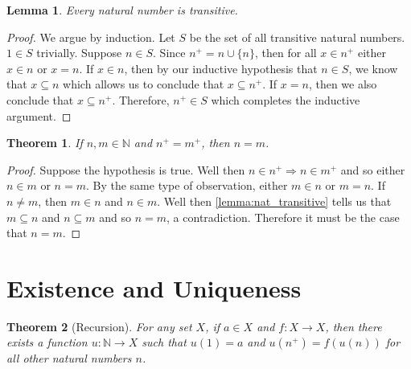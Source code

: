 \documentclass{article}
\theoremstyle{definition}
\theoremstyle{definition}
\theoremstyle{plain}
\theoremstyle{remark}
\theoremstyle{plain}
\newtheorem{theorem}{Theorem}[section]
\theoremstyle{remark}
\theoremstyle{plain}
\newtheorem{lemma}{Lemma}[section]
\theoremstyle{plain}
\theoremstyle{plain}
\theoremstyle{plain}
\begin{document}
\begin{lemma}
  Every natural number is transitive.
  \label{lemma:nat_transitive}
\end{lemma}

\begin{proof}
  We argue by induction. 
  Let \( S \) be the set of all transitive natural numbers. \( 1 \in S \) 
  trivially. Suppose \( n \in S \). Since \( n^{+} = n \cup \{n\} \), then 
  for all \( x \in n^{+} \) either \( x \in n \) or \( x = n \). If 
  \( x \in n \), then 
  by our inductive hypothesis that \( n \in S \), we know that 
  \( x \subseteq n\) which allows us to conclude that \( x \subseteq n^{+} \). 
  If \( x = n \), then we also conclude that \( x \subseteq n^{+} \). 
  Therefore, \( n^{+} \in S \) which completes the inductive argument.
\end{proof}

\begin{theorem}
  If \( n, m \in \mathbb{N}\) and \( n^{+} = m^{+} \), then \( n = m \).
  \label{thm:fifth_peano_axiom}
\end{theorem}

\begin{proof}
  Suppose the hypothesis is true. Well then 
  \( n \in n^{+} \Rightarrow n \in m^{+} \) and so either \( n \in m \) or 
  \( n = m \). By the same type of observation, either \( m \in n \) or \( m = n \). 
  If \( n \neq m\), then \( m \in n \) and \( n \in m \). 
  Well then \autoref{lemma:nat_transitive} tells us that 
  \( m \subseteq n \) and \( n \subseteq m \) and so \( n = m \), a 
  contradiction. Therefore it must be the case that \( n = m \).
\end{proof}

\section{Existence and Uniqueness}

\begin{theorem}[Recursion]
  For any set \( X \), if \( a \in X \) and \( f : X \rightarrow X \), then 
  there exists a function \( u: \mathbb{N} \rightarrow X \) such that 
  \( u(1) = a \) and \( u(n^{+}) = f(u(n)) \) for all other natural numbers 
  \( n \). 
  \label{recursion}
\end{theorem}
\end{document}
